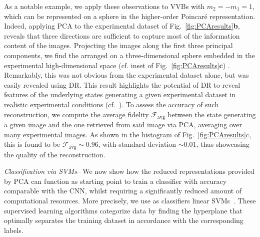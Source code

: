 \documentclass[
	aps, prl, superscriptaddress, twocolumn,
	10pt
	floatfix, 
    nofootinbib,
	tightenlines
]{revtex4-1}
\begin{document}
As a notable example, we apply these observations to \acp{VVB} with $m_2=-m_1=1$, which can be represented on a sphere in the higher-order Poincar\'e representation. 
Indeed, applying PCA to the experimental dataset of Fig.~\ref{fig:PCAresults}{\bf b}, reveals that three directions are sufficient to capture most of the information content of the images. Projecting the images along the first three principal components, we find the arranged on a three-dimensional sphere embedded in the experimental high-dimensional space (cf. inset of Fig.~\ref{fig:PCAresults}{\bf c}) .
Remarkably, this was not obvious from the experimental dataset alone, but was easily revealed using \ac{DR}. This result highlights the potential of \ac{DR} to reveal features of the underlying states generating a given experimental dataset in realistic experimental conditions (cf.~\cite{SI}).
To assess the accuracy of such reconstruction, we compute the average fidelity $\mathcal F_{\text{avg}}$ between the state generating a given image and the one retrieved from said image via PCA, averaging over many experimental images.
As shown in the histogram of Fig.~\ref{fig:PCAresults}c, this is found to be $\mathcal F_{\text{avg}}\sim0.96$, with standard deviation $\sim0.01$, thus showcasing the quality of the reconstruction.

\textit{Classification via SVMs}-- We now show how the reduced representations provided by \ac{PCA} can function as starting point to train a classifier with accuracy comparable with the \ac{CNN}, whilst requiring a significantly reduced amount of computational resources.
More precisely, we use as classifiers linear \acp{SVM}~\cite{hearst1998svm}. These supervised learning algorithms categorize data by finding the hyperplane that optimally separates the training dataset in accordance with the corresponding labels. 
\end{document}
